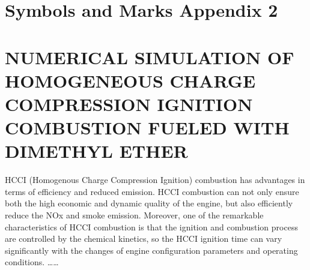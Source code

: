 \documentclass[UTF8,a4paper,12pt]{ctexart}
\numberwithin{equation}{section}
\begin{document}
\newpage
{}

\section*{Symbols and Marks Appendix 2}



\newpage
{}
\fancyhead[RH]{}
\section*{NUMERICAL SIMULATION OF HOMOGENEOUS CHARGE COMPRESSION IGNITION COMBUSTION FUELED WITH DIMETHYL ETHER}%

HCCI (Homogenous Charge Compression Ignition) combustion has advantages in terms of efficiency and reduced emission. HCCI combustion can not only ensure both the high economic and dynamic quality of the engine, but also efficiently reduce the NOx and smoke emission. Moreover, one of the remarkable characteristics of HCCI combustion is that the ignition and combustion process are controlled by the chemical kinetics, so the HCCI ignition time can vary significantly with the changes of engine configuration parameters and operating conditions. ……%
\end{document}
